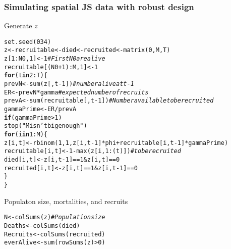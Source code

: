 \documentclass[color=usenames,dvipsnames]{beamer}\usepackage[]{graphicx}\usepackage[]{color}
\makeatletter
\newcommand{\hlnum}[1]{\textcolor[rgb]{0.69,0.494,0}{#1}}%
\newcommand{\hlstr}[1]{\textcolor[rgb]{0.749,0.012,0.012}{#1}}%
\newcommand{\hlcom}[1]{\textcolor[rgb]{0.514,0.506,0.514}{\textit{#1}}}%
\newcommand{\hlopt}[1]{\textcolor[rgb]{0,0,0}{#1}}%
\newcommand{\hlstd}[1]{\textcolor[rgb]{0,0,0}{#1}}%
\newcommand{\hlkwa}[1]{\textcolor[rgb]{0,0,0}{\textbf{#1}}}%
\newcommand{\hlkwb}[1]{\textcolor[rgb]{0,0.341,0.682}{#1}}%
\newcommand{\hlkwd}[1]{\textcolor[rgb]{0.004,0.004,0.506}{#1}}%
\newenvironment{kframe}{%
 \def\at@end@of@kframe{}%
 \ifinner\ifhmode%
  \def\at@end@of@kframe{\end{minipage}}%
  \begin{minipage}{\columnwidth}%
 \fi\fi%
 \def\FrameCommand##1{\hskip\@totalleftmargin \hskip-\fboxsep
 \colorbox{shadecolor}{##1}\hskip-\fboxsep
     \hskip-\linewidth \hskip-\@totalleftmargin \hskip\columnwidth}%
 \MakeFramed {\advance\hsize-\width
   \@totalleftmargin\z@ \linewidth\hsize
   \@setminipage}}%
 {\par\unskip\endMakeFramed%
 \at@end@of@kframe}
\newenvironment{knitrout}{}{} %
\makeatother
\begin{document}
\begin{frame}[fragile]
  \frametitle{Simulating spatial JS data with robust design}
{Generate $z$}
\begin{knitrout}\scriptsize
{}\color{fgcolor}\begin{kframe}
\begin{alltt}
\hlkwd{set.seed}\hlstd{(}\hlnum{034}\hlstd{)}
\hlstd{z} \hlkwb{<-} \hlstd{recruitable} \hlkwb{<-} \hlstd{died} \hlkwb{<-} \hlstd{recruited} \hlkwb{<-} \hlkwd{matrix}\hlstd{(}\hlnum{0}\hlstd{, M, T)}
\hlstd{z[}\hlnum{1}\hlopt{:}\hlstd{N0,}\hlnum{1}\hlstd{]} \hlkwb{<-} \hlnum{1} \hlcom{# First N0 are alive}
\hlstd{recruitable[(N0}\hlopt{+}\hlnum{1}\hlstd{)}\hlopt{:}\hlstd{M,}\hlnum{1}\hlstd{]} \hlkwb{<-} \hlnum{1}
\hlkwa{for}\hlstd{(t} \hlkwa{in} \hlnum{2}\hlopt{:}\hlstd{T) \{}
    \hlstd{prevN} \hlkwb{<-} \hlkwd{sum}\hlstd{(z[,t}\hlopt{-}\hlnum{1}\hlstd{])} \hlcom{# number alive at t-1}
    \hlstd{ER} \hlkwb{<-} \hlstd{prevN}\hlopt{*}\hlstd{gamma} \hlcom{# expected number of recruits}
    \hlstd{prevA} \hlkwb{<-} \hlkwd{sum}\hlstd{(recruitable[,t}\hlopt{-}\hlnum{1}\hlstd{])} \hlcom{# Number available to be recruited}
    \hlstd{gammaPrime} \hlkwb{<-} \hlstd{ER}\hlopt{/}\hlstd{prevA}
    \hlkwa{if}\hlstd{(gammaPrime} \hlopt{>} \hlnum{1}\hlstd{)}
        \hlkwd{stop}\hlstd{(}\hlstr{"M isn't big enough"}\hlstd{)}
    \hlkwa{for}\hlstd{(i} \hlkwa{in} \hlnum{1}\hlopt{:}\hlstd{M) \{}
        \hlstd{z[i,t]} \hlkwb{<-} \hlkwd{rbinom}\hlstd{(}\hlnum{1}\hlstd{,} \hlnum{1}\hlstd{, z[i,t}\hlopt{-}\hlnum{1}\hlstd{]}\hlopt{*}\hlstd{phi} \hlopt{+} \hlstd{recruitable[i,t}\hlopt{-}\hlnum{1}\hlstd{]}\hlopt{*}\hlstd{gammaPrime)}
        \hlstd{recruitable[i,t]} \hlkwb{<-} \hlnum{1} \hlopt{-} \hlkwd{max}\hlstd{(z[i,}\hlnum{1}\hlopt{:}\hlstd{(t)])} \hlcom{# to be recruited}
        \hlstd{died[i,t]} \hlkwb{<-} \hlstd{z[i,t}\hlopt{-}\hlnum{1}\hlstd{]}\hlopt{==}\hlnum{1} \hlopt{&} \hlstd{z[i,t]}\hlopt{==}\hlnum{0}
        \hlstd{recruited[i,t]} \hlkwb{<-} \hlstd{z[i,t]}\hlopt{==}\hlnum{1} \hlopt{&} \hlstd{z[i,t}\hlopt{-}\hlnum{1}\hlstd{]}\hlopt{==}\hlnum{0}
    \hlstd{\}}
\hlstd{\}}
\end{alltt}
\end{kframe}
\end{knitrout}
\pause
\vfill
{\normalsize Populaton size, mortalities, and recruits}
\begin{knitrout}\scriptsize
{}\color{fgcolor}\begin{kframe}
\begin{alltt}
\hlstd{N} \hlkwb{<-} \hlkwd{colSums}\hlstd{(z)} \hlcom{# Population size}
\hlstd{Deaths} \hlkwb{<-} \hlkwd{colSums}\hlstd{(died)}
\hlstd{Recruits} \hlkwb{<-} \hlkwd{colSums}\hlstd{(recruited)}
\hlstd{everAlive} \hlkwb{<-} \hlkwd{sum}\hlstd{(}\hlkwd{rowSums}\hlstd{(z)}\hlopt{>}\hlnum{0}\hlstd{)}
\end{alltt}
\end{kframe}
\end{knitrout}
\end{frame}
\end{document}
